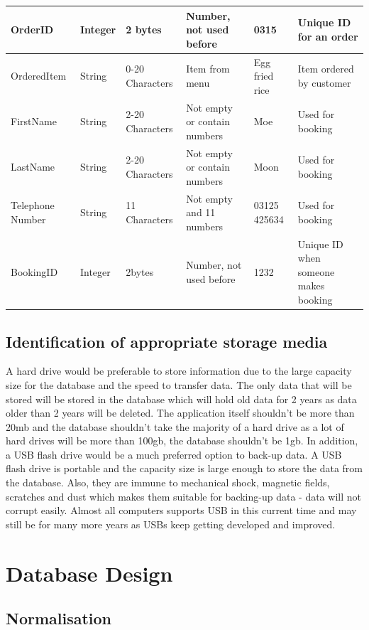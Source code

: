 \begin{center}
\begin{tabular}{ | p{2cm}| p{1cm} | p{1cm} | p{2cm} | p{1cm} | p{3cm} | }
    OrderID & Integer & 2 bytes & Number, not used before & 0315 & Unique ID for an order \\ \hline
    OrderedItem &String & 0-20 Characters &Item from menu & Egg fried rice & Item ordered by customer \\ \hline
    FirstName & String & 2-20 Characters &Not empty or contain numbers & Moe & Used for booking \\ \hline
    LastName & String & 2-20 Characters &Not empty or contain numbers & Moon & Used for booking \\ \hline
    Telephone Number&String&11 Characters & Not empty and 11 numbers & 03125 425634 & Used for booking \\ \hline
    BookingID & Integer & 2bytes &Number, not used before & 1232 & Unique ID when someone makes booking \\ \hline


\end{tabular}
\label{tab:range_examples}
\end{center}

\subsection{Identification of appropriate storage media}

A hard drive would be preferable to store information due to the large capacity size for the database and the speed to transfer data. The only data that will be stored will be stored in the database which will hold old data for 2 years as data older than 2 years will be deleted. The application itself shouldn't be more than 20mb and the database shouldn't take the majority of a hard drive as a lot of hard drives will be more than 100gb, the database shouldn't be 1gb.  In addition, a USB flash drive would be a much preferred option to back-up data. A USB flash drive is portable and the capacity size is large enough to store the data from the database. Also, they are immune to mechanical shock, magnetic fields, scratches and dust which makes them suitable for backing-up data - data will not corrupt easily. Almost all computers supports USB in this current time and may still be for many more years as USBs keep getting developed and improved.


\section{Database Design}
\subsection{Normalisation}

